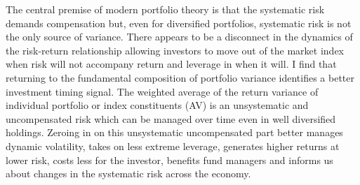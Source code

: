 The central premise of modern portfolio theory is that the systematic risk demands compensation but, even for diversified portfolios, systematic risk is not the only source of variance. There appears to be a disconnect in the dynamics of the risk-return relationship allowing investors to move out of the market index when risk will not accompany return and leverage in when it will. I find that returning to the fundamental composition of portfolio variance identifies a better investment timing signal. The weighted average of the return variance of individual portfolio or index constituents (AV) is an unsystematic and uncompensated risk which can be managed over time even in well diversified holdings. Zeroing in on this unsystematic uncompensated part better manages dynamic volatility, takes on less extreme leverage, generates higher returns at lower risk, costs less for the investor, benefits fund managers and informs us about changes in the systematic risk across the economy. 

